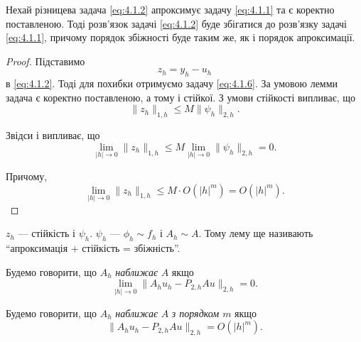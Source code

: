 \begin{lemma}
    Нехай різницева задача \eqref{eq:4.1.2} апроксимує задачу \eqref{eq:4.1.1} та є коректно поставленою. Тоді розв'язок задачі \eqref{eq:4.1.2} буде збігатися до розв'язку задачі \eqref{eq:4.1.1}, причому порядок збіжності буде таким же, як і порядок апроксимації.
\end{lemma}
\begin{proof}
    Підставимо
    \begin{equation}
        z_h = y_h - u_h
    \end{equation}
    в \eqref{eq:4.1.2}. Тоді для похибки отримуємо задачу \eqref{eq:4.1.6}. За умовою лемми задача є коректно поставленою, а тому і стійкої. З умови стійкості випливає, що
    \begin{equation}
        \label{eq:4.1.10}
        \|z_h\|_{1, h} \le M \|\psi_h\|_{2,h}.
    \end{equation}

    Звідси і випливає, що 
    \begin{equation}
        \label{eq:4.1.11}
        \lim_{|h| \to 0} \|z_h\|_{1, h} \le M \lim_{|h| \to 0} \|\psi_h\|_{2, h} = 0.
    \end{equation}

    Причому,
    \begin{equation}
        \label{eq:4.1.12}
        \lim_{|h| \to 0} \|z_h\|_{1, h} \le M \cdot O(|h|^m) = O(|h|^m).
    \end{equation}
\end{proof}

\begin{remark}
    $z_h$ --- стійкість і $\psi_h$. $\psi_h$ --- $\phi_h \sim f_h$ і $A_h \sim A$.
    Тому лему ще називають ``апроксимація + стійкість = збіжність''.
\end{remark}

\begin{definition}
    Будемо говорити, що $A_h$ \textit{наближає} $A$ якщо
    \begin{equation}
        \label{eq:4.1.14}
        \lim_{|h| \to 0} \|A_h u_h - P_{2, h} A u\|_{2, h} = 0.
    \end{equation}
\end{definition}

\begin{definition}
    Будемо говорити, що $A_h$ \textit{наближає} $A$ \textit{з порядком $m$} якщо
    \begin{equation}
        \label{eq:4.1.15}
        \|A_h u_h - P_{2, h} A u\|_{2, h} = O(|h|^m).
    \end{equation}
\end{definition}


